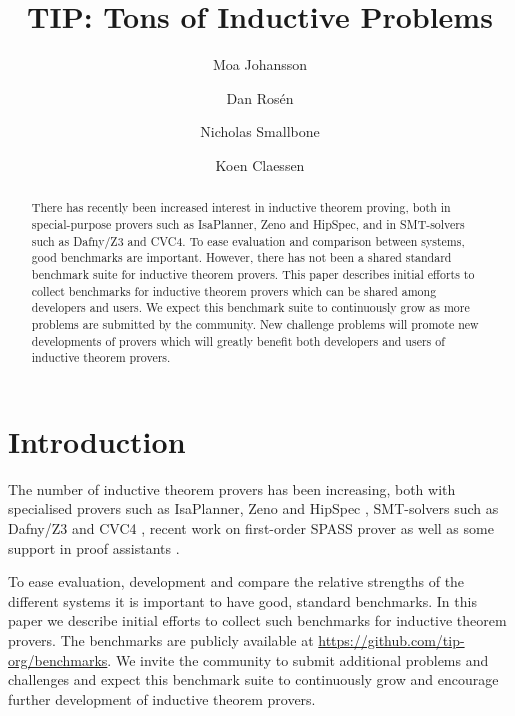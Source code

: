 \documentclass{llncs}
\begin{document}
\title{TIP: Tons of Inductive Problems}

\author{Moa Johansson \and Dan Ros\'en \and Nicholas Smallbone \and Koen Claessen}

\titlerunning{}

\maketitle

\begin{abstract}
There has recently been increased interest in inductive theorem
proving, both in special-purpose provers such as
IsaPlanner, Zeno and HipSpec, and in SMT-solvers such as
Dafny/Z3 and CVC4. To ease evaluation and comparison between systems,
good benchmarks are important. However, there has not been a shared
standard benchmark suite for inductive theorem provers. This paper
describes initial efforts to collect benchmarks for inductive theorem
provers which can be shared among developers and users. 
We expect this benchmark suite to continuously grow as
more problems are submitted by the community. New challenge problems
will promote new developments of provers which will greatly benefit
both developers and users of inductive theorem provers. 

\end{abstract}

\section{Introduction}

The number of inductive theorem provers has been increasing, both with specialised provers such as IsaPlanner, Zeno and HipSpec \cite{isaplanner,zeno,hipspecCADE}, SMT-solvers such as Dafny/Z3 and CVC4 \cite{dafny,cvc4}, recent work on first-order SPASS prover \cite{SPASSInduction} as well as some support in proof assistants \cite{acl2,hipster}. 

To ease evaluation, development and compare the relative strengths of the different systems it is important to have good, standard benchmarks. In this paper we describe initial efforts to collect such benchmarks for inductive theorem provers. The benchmarks are publicly available at \url{https://github.com/tip-org/benchmarks}. We invite the community to submit additional problems and challenges and expect this benchmark suite to continuously grow and encourage further development of inductive theorem provers. 
\end{document}
